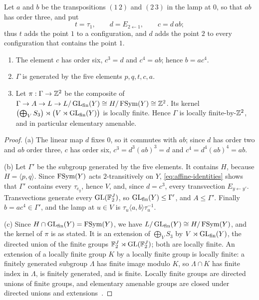 Let $a$ and $b$ be the transpositions $(1\,2)$ and $(2\,3)$ in the lamp at $0$, so that $ab$ has order three, and put
\[
t=\tau_1,\qquad d=E_{2\leftarrow1},\qquad c=d\,ab ;
\]
thus $t$ adds the point $1$ to a configuration, and $d$ adds the point $2$ to every configuration that contains the point $1$.

\begin{lemma}\label{lem:structure}
\begin{enumerate}[label=(\alph*),itemsep=1pt]
\item The element $c$ has order six, $c^3=d$ and $c^4=ab$; hence $b=ac^4$.
\item $\Gamma$ is generated by the five elements $p,q,t,c,a$.
\item Let $\pi:\Gamma\to\mathbb Z^2$ be the composite of $\Gamma\to A\to L\to L/\operatorname{GL}_{\rm fin}(Y)\cong H/\operatorname{FSym}(Y)\cong\mathbb Z^2$. Its kernel
$\bigl(\bigoplus_VS_3\bigr)\rtimes\bigl(V\rtimes\operatorname{GL}_{\rm fin}(Y)\bigr)$ is locally finite. Hence $\Gamma$ is locally finite-by-$\mathbb Z^2$, and in
particular elementary amenable.
\end{enumerate}
\end{lemma}

\begin{proof}
(a) The linear map $d$ fixes $0$, so it commutes with $ab$; since $d$ has order two and $ab$ order three, $c$ has order six, $c^3=d^3(ab)^3=d$ and
$c^4=d^4(ab)^4=ab$.

(b) Let $\Gamma'$ be the subgroup generated by the five elements. It contains $H$, because $H=\langle p,q\rangle$. Since $\operatorname{FSym}(Y)$ acts
$2$-transitively on $Y$, \eqref{eq:affine-identities} shows that $\Gamma'$ contains every $\tau_{e_y}$, hence $V$, and, since $d=c^3$, every
transvection $E_{y\leftarrow y'}$. Transvections generate every $\operatorname{GL}(\mathbb F_2^J)$, so $\operatorname{GL}_{\rm fin}(Y)\le\Gamma'$, and $A\le\Gamma'$. Finally
$b=ac^4\in\Gamma'$, and the lamp at $u\in V$ is $\tau_u\langle a,b\rangle\tau_u^{-1}$.

(c) Since $H\cap\operatorname{GL}_{\rm fin}(Y)=\operatorname{FSym}(Y)$, we have $L/\operatorname{GL}_{\rm fin}(Y)\cong H/\operatorname{FSym}(Y)$, and the kernel of $\pi$ is as stated. It is an
extension of $\bigoplus_VS_3$ by $V\rtimes\operatorname{GL}_{\rm fin}(Y)$, the directed union of the finite groups $\mathbb F_2^J\rtimes\operatorname{GL}(\mathbb F_2^J)$; both are locally
finite. An extension of a locally finite group $K$ by a locally finite group is locally finite: a finitely generated subgroup $\Lambda$ has finite
image modulo $K$, so $\Lambda\cap K$ has finite index in $\Lambda$, is finitely generated, and is finite. Locally finite groups are directed
unions of finite groups, and elementary amenable groups are closed under directed unions and extensions~\cite{Chou1980}.
\end{proof}

